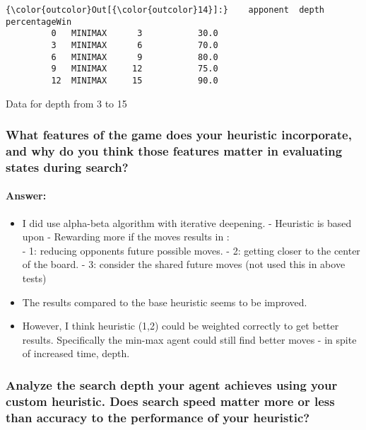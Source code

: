 \documentclass[11pt]{article}
\providecommand{\tightlist}{%
      \setlength{\itemsep}{0pt}\setlength{\parskip}{0pt}}
\begin{document}
\begin{Verbatim}[commandchars=\\\{\}]
{\color{outcolor}Out[{\color{outcolor}14}]:}    apponent  depth  percentageWin
         0   MINIMAX      3           30.0
         3   MINIMAX      6           70.0
         6   MINIMAX      9           80.0
         9   MINIMAX     12           75.0
         12  MINIMAX     15           90.0
\end{Verbatim}
            
    Data for depth from 3 to 15

    \hypertarget{what-features-of-the-game-does-your-heuristic-incorporate-and-why-do-you-think-those-features-matter-in-evaluating-states-during-search}{%
\subsubsection{What features of the game does your heuristic
incorporate, and why do you think those features matter in evaluating
states during
search?}\label{what-features-of-the-game-does-your-heuristic-incorporate-and-why-do-you-think-those-features-matter-in-evaluating-states-during-search}}

    \hypertarget{answer}{%
\paragraph{Answer:}\label{answer}}

\begin{itemize}
\tightlist
\item
  I did use alpha-beta algorithm with iterative deepening. - Heuristic
  is based upon - Rewarding more if the moves results in :\\
  - 1: reducing opponents future possible moves. - 2: getting closer to
  the center of the board. - 3: consider the shared future moves (not
  used this in above tests)
\item
  The results compared to the base heuristic seems to be improved.
\item
  However, I think heuristic (1,2) could be weighted correctly to get
  better results. Specifically the min-max agent could still find better
  moves - in spite of increased time, depth.
\end{itemize}

    \hypertarget{analyze-the-search-depth-your-agent-achieves-using-your-custom-heuristic.-does-search-speed-matter-more-or-less-than-accuracy-to-the-performance-of-your-heuristic}{%
\subsubsection{Analyze the search depth your agent achieves using your
custom heuristic. Does search speed matter more or less than accuracy to
the performance of your
heuristic?}\label{analyze-the-search-depth-your-agent-achieves-using-your-custom-heuristic.-does-search-speed-matter-more-or-less-than-accuracy-to-the-performance-of-your-heuristic}}
\end{document}
